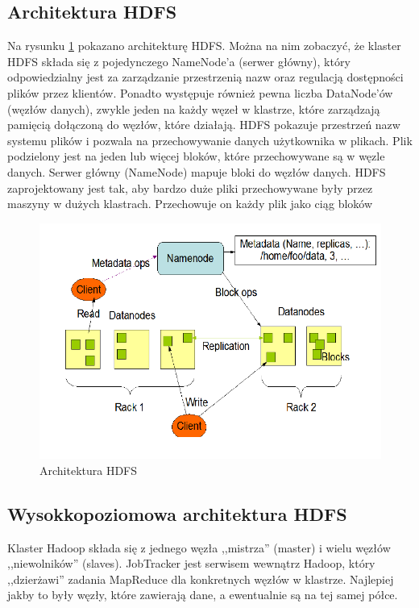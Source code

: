 \documentclass[10pt,twocolumn]{llncs}          %
\begin{document}
\subsection{Architektura HDFS}
\label{ssub:hdfs_architecture}
Na rysunku \ref{fig:hdfs_architecture} pokazano architekturę HDFS. Można na nim zobaczyć, że klaster HDFS składa się z pojedynczego NameNode'a (serwer główny), który odpowiedzialny jest za zarządzanie przestrzenią nazw oraz regulacją dostępności plików przez klientów. Ponadto występuje również pewna liczba DataNode'ów (węzłów danych), zwykle jeden na każdy węzeł w klastrze, które zarządzają pamięcią dołączoną do węzłów, które działają. HDFS pokazuje przestrzeń nazw systemu plików i pozwala na przechowywanie danych użytkownika w plikach. Plik podzielony jest na jeden lub więcej bloków, które przechowywane są w węzle danych. Serwer główny (NameNode) mapuje bloki do węzłów danych.
HDFS zaprojektowany jest tak, aby bardzo duże pliki przechowywane były przez maszyny w dużych klastrach. Przechowuje on  każdy plik jako ciąg bloków


\begin{figure}
    \centerline{\includegraphics[scale=0.4]{obrazki/HDFS_architecture.png}}
    \caption{Architektura HDFS}
    \label{fig:hdfs_architecture}       %
\end{figure}

\subsection{Wysokkopoziomowa architektura HDFS}
\label{ssub:hdfs_high_level_architecture}
Klaster Hadoop składa się z jednego węzła ,,mistrza'' (master) i wielu węzłów ,,niewolników'' (slaves). JobTracker jest serwisem wewnątrz Hadoop, który ,,dzierżawi'' zadania MapReduce dla konkretnych węzłów w klastrze. Najlepiej jakby to były węzły, które zawierają dane, a ewentualnie są na tej samej półce.
\end{document}
